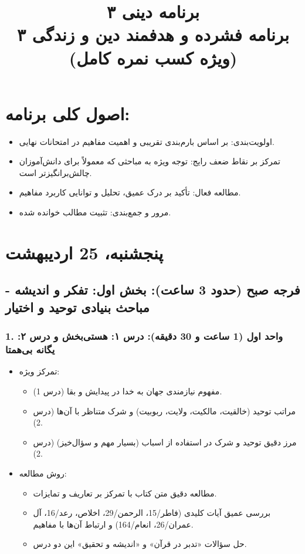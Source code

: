 \documentclass{article}
\title{برنامه دینی ۳ \\ \mdseries\large برنامه فشرده و هدفمند دین و زندگی ۳ (ویژه کسب نمره کامل)}
\author{} %
\date{}   %
\begin{document}
\maketitle

\section*{اصول کلی برنامه:}

\begin{itemize}
    \item اولویت‌بندی: بر اساس بارم‌بندی تقریبی و اهمیت مفاهیم در امتحانات نهایی.
    \item تمرکز بر نقاط ضعف رایج: توجه ویژه به مباحثی که معمولاً برای دانش‌آموزان چالش‌برانگیزتر است.
    \item مطالعه فعال: تأکید بر درک عمیق، تحلیل و توانایی کاربرد مفاهیم.
    \item مرور و جمع‌بندی: تثبیت مطالب خوانده شده.
\end{itemize}
\section*{پنجشنبه، 25 اردیبهشت}

\subsection*{فرجه صبح (حدود 3 ساعت): بخش اول: تفکر و اندیشه - مباحث بنیادی توحید و اختیار}

\subsubsection*{1. واحد اول (1 ساعت و 30 دقیقه): درس ۱: هستی‌بخش و درس ۲: یگانه بی‌همتا}
\begin{itemize}
    \item تمرکز ویژه:
    \begin{itemize}
        \item مفهوم نیازمندی جهان به خدا در پیدایش و بقا (درس 1).
        \item مراتب توحید (خالقیت، مالکیت، ولایت، ربوبیت) و شرک متناظر با آن‌ها (درس 2).
        \item مرز دقیق توحید و شرک در استفاده از اسباب (بسیار مهم و سؤال‌خیز) (درس 2).
    \end{itemize}
    \item روش مطالعه:
    \begin{itemize}
        \item مطالعه دقیق متن کتاب با تمرکز بر تعاریف و تمایزات.
        \item بررسی عمیق آیات کلیدی (فاطر/15، الرحمن/29، اخلاص، رعد/16، آل عمران/26، انعام/164) و ارتباط آن‌ها با مفاهیم.
        \item حل سؤالات «تدبر در قرآن» و «اندیشه و تحقیق» این دو درس.
    \end{itemize}
\end{itemize}
\end{document}
